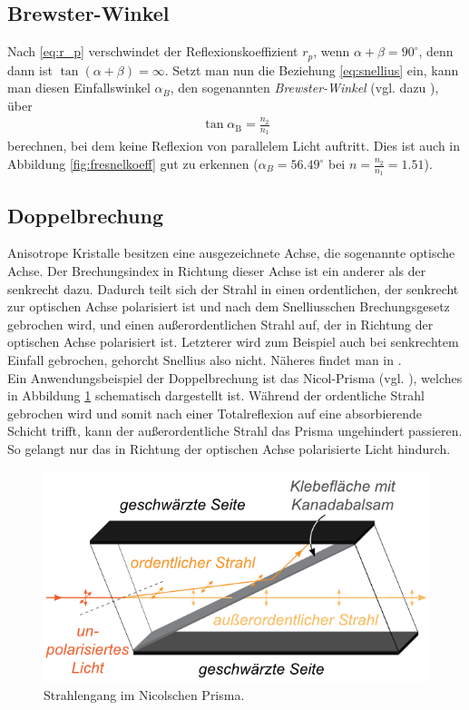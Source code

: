 \documentclass[12pt,a4paper,titlepage,headinclude,bibtotoc]{scrartcl}
\begin{document}
\subsection{Brewster-Winkel}
Nach \eqref{eq:r_p} verschwindet der Reflexionskoeffizient $r_p$, wenn $\alpha+\beta=90^\circ$, denn dann ist $\tan(\alpha+\beta)=\infty$.
Setzt man nun die Beziehung \eqref{eq:snellius} ein, kann man diesen Einfallswinkel $\alpha_B$, den sogenannten \emph{Brewster-Winkel} (vgl. dazu \cite[S.240]{demtroeder2}), über
\begin{align}
	\tan\alpha_\text{B}=\frac{n_2}{n_1}
	\label{eq:brewster}
\end{align}
berechnen, bei dem keine Reflexion von parallelem Licht auftritt.
Dies ist auch in Abbildung \ref{fig:fresnelkoeff} gut zu erkennen ($\alpha_B=56.49^\circ$ bei $n=\frac{n_2}{n_1}=1.51$).

\subsection{Doppelbrechung}
Anisotrope Kristalle besitzen eine ausgezeichnete Achse, die sogenannte optische Achse.
Der Brechungsindex in Richtung dieser Achse ist ein anderer als der senkrecht dazu.
Dadurch teilt sich der Strahl in einen ordentlichen, der senkrecht zur optischen Achse polarisiert ist und nach dem Snelliusschen Brechungsgesetz gebrochen wird,  und einen außerordentlichen Strahl auf, der in Richtung der optischen Achse polarisiert ist.
Letzterer wird zum Beispiel auch bei senkrechtem Einfall gebrochen, gehorcht Snellius also nicht.
Näheres findet man in \cite[S.264ff.]{saleh-teich}.\\
Ein Anwendungsbeispiel der Doppelbrechung ist das Nicol-Prisma (vgl. \cite[S.255]{demtroeder2}), welches in Abbildung \ref{fig:nicol} schematisch dargestellt ist.
Während der ordentliche Strahl gebrochen wird und somit nach einer Totalreflexion auf eine absorbierende Schicht trifft, kann der außerordentliche Strahl das Prisma ungehindert passieren.
So gelangt nur das in Richtung der optischen Achse polarisierte Licht hindurch.

\begin{figure}[!h]
	\centering
	\includegraphics[scale=0.7]{nicol.png}
	\caption{Strahlengang im Nicolschen Prisma. \cite[Datum: 23.03.2015]{LP20}}
	\label{fig:nicol}
\end{figure}
\end{document}

